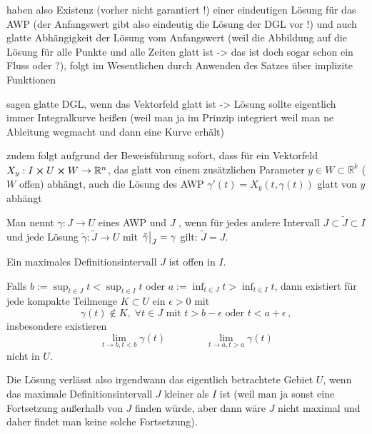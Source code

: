 \documentclass[../H_Analysis_main.tex]{subfiles}
\begin{document}
haben also Existenz (vorher nicht garantiert !) einer eindeutigen Lösung für das AWP (der Anfangswert gibt also eindeutig die Lösung der DGL vor !) und auch glatte Abhängigkeit der Lösung vom Anfangswert (weil die Abbildung auf die Lösung für alle Punkte und alle Zeiten glatt ist -> das ist doch sogar schon ein Fluss oder ?), folgt im Wesentlichen durch Anwenden des Satzes über implizite Funktionen

sagen glatte DGL, wenn das Vektorfeld glatt ist -> Lösung sollte eigentlich immer Integralkurve heißen (weil man ja im Prinzip integriert weil man ne Ableitung wegmacht und dann eine Kurve erhält)

zudem folgt aufgrund der Beweisführung sofort, dass für ein Vektorfeld $X_y: I \cross U \cross W \rightarrow \mathbb{R}^n$, das glatt von einem zusätzlichen Parameter $y \in W \subset \mathbb{R}^k$ ($W$ offen) abhängt, auch die Lösung des AWP $\gamma'(t) = X_y(t, \gamma(t))$ glatt von $y$ abhängt


Man nennt $\gamma: J \rightarrow U$  eines AWP und $J$ , wenn für jedes andere Intervall $J \subset \tilde{J} \subset I$ und jede Lösung $\tilde{\gamma}: \tilde{J} \rightarrow U$ mit $\eval{\tilde{\gamma}}_J = \gamma$ gilt: $\tilde{J} = J$.

\begin{satz}
Ein maximales Definitionsintervall $J$ ist offen in $I$.

Falls $b := \sup_{t \in J} t < \sup_{t \in I} t$ oder $a := \inf_{t \in J} t > \inf_{t \in I} t$, dann existiert für jede kompakte Teilmenge $K \subset U$ ein $\epsilon > 0$ mit
\begin{equation}
\gamma(t) \notin K, \; \forall t \in J \text{ mit } t > b - \epsilon \text{ oder } t < a + \epsilon \, ,
\end{equation}
insbesondere existieren
\begin{equation}
\lim_{t \rightarrow b,  t < b} \gamma(t) \qquad \qquad \lim_{t \rightarrow a, t > a} \gamma(t)
\end{equation}
nicht in $U$.
\end{satz}

Die Lösung verlässt also irgendwann das eigentlich betrachtete Gebiet $U$, wenn das maximale Definitionsintervall $J$ kleiner als $I$ ist (weil man ja sonst eine Fortsetzung außerhalb von $J$ finden würde, aber dann wäre $J$ nicht maximal und daher findet man keine solche Fortsetzung).
\end{document}
